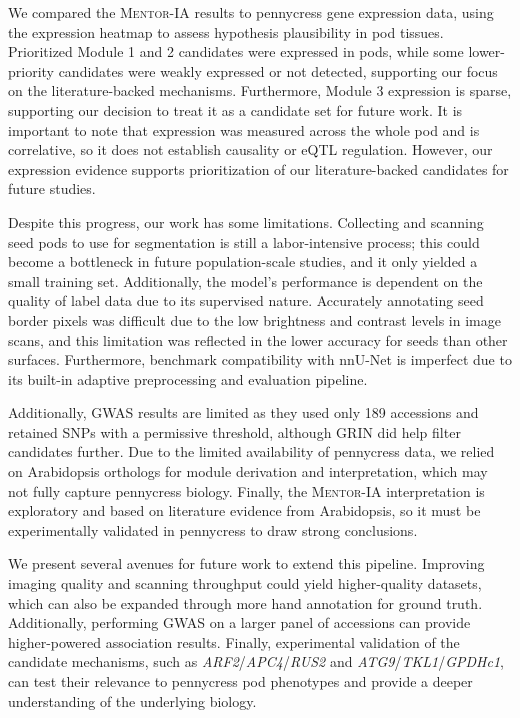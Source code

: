 We compared the \textsc{Mentor-IA} results to pennycress gene expression data, using the expression heatmap to assess hypothesis plausibility in pod tissues. Prioritized Module 1 and 2 candidates were expressed in pods, while some lower-priority candidates were weakly expressed or not detected, supporting our focus on the literature-backed mechanisms. Furthermore, Module 3 expression is sparse, supporting our decision to treat it as a candidate set for future work. It is important to note that expression was measured across the whole pod and is correlative, so it does not establish causality or eQTL regulation. However, our expression evidence supports prioritization of our literature-backed candidates for future studies.

Despite this progress, our work has some limitations. Collecting and scanning seed pods to use for segmentation is still a labor-intensive process; this could become a bottleneck in future population-scale studies, and it only yielded a small training set. Additionally, the model's performance is dependent on the quality of label data due to its supervised nature. Accurately annotating seed border pixels was difficult due to the low brightness and contrast levels in image scans, and this limitation was reflected in the lower accuracy for seeds than other surfaces. Furthermore, benchmark compatibility with nnU-Net is imperfect due to its built-in adaptive preprocessing and evaluation pipeline.

Additionally, GWAS results are limited as they used only 189 accessions and retained SNPs with a permissive threshold, although GRIN did help filter candidates further. Due to the limited availability of pennycress data, we relied on Arabidopsis orthologs for module derivation and interpretation, which may not fully capture pennycress biology. Finally, the \textsc{Mentor-IA} interpretation is exploratory and based on literature evidence from Arabidopsis, so it must be experimentally validated in pennycress to draw strong conclusions.

We present several avenues for future work to extend this pipeline. Improving imaging quality and scanning throughput could yield higher-quality datasets, which can also be expanded through more hand annotation for ground truth. Additionally, performing GWAS on a larger panel of accessions can provide higher-powered association results. Finally, experimental validation of the candidate mechanisms, such as \textit{ARF2}/\textit{APC4}/\textit{RUS2} and \textit{ATG9}/\textit{TKL1}/\textit{GPDHc1}, can test their relevance to pennycress pod phenotypes and provide a deeper understanding of the underlying biology.

